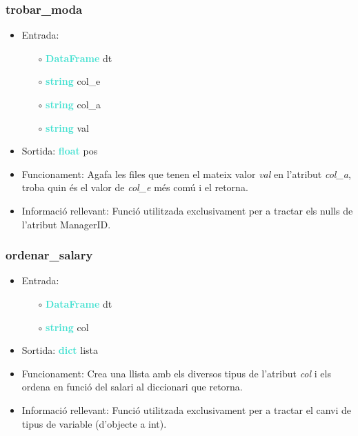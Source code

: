 \documentclass[a4paper, 11pt]{article}
\begin{document}
\subsubsection{trobar\_moda}
\begin{itemize}
    \item Entrada:
    \begin{itemize}
        \item [$\circ$] \textbf{\textcolor{Turquoise}{DataFrame}} dt
        \item [$\circ$] \textbf{\textcolor{Turquoise}{string}} col\_e
        \item [$\circ$] \textbf{\textcolor{Turquoise}{string}} col\_a
        \item [$\circ$] \textbf{\textcolor{Turquoise}{string}} val
    \end{itemize}
    \item Sortida: \textbf{\textcolor{Turquoise}{float}} pos
    \item Funcionament: Agafa les files que tenen el mateix valor \textit{val} en l'atribut \textit{col\_a}, troba quin és el valor de \textit{col\_e} més comú i el retorna.
    \item Informació rellevant: Funció utilitzada exclusivament per a tractar els nulls de l'atribut ManagerID. \label{trobar_moda}
\end{itemize}


\subsubsection{ordenar\_salary}
\begin{itemize}
    \item Entrada:
    \begin{itemize}
        \item [$\circ$] \textbf{\textcolor{Turquoise}{DataFrame}} dt
        \item [$\circ$] \textbf{\textcolor{Turquoise}{string}} col
    \end{itemize}
    \item Sortida: \textbf{\textcolor{Turquoise}{dict}} lista
    \item Funcionament: Crea una llista amb els diversos tipus de l'atribut \textit{col} i els ordena en funció del salari al diccionari que retorna.
    \item Informació rellevant: Funció utilitzada exclusivament per a tractar el canvi de tipus de variable (d'objecte a int). \label{ordenar_salary}
\end{itemize}
\end{document}
